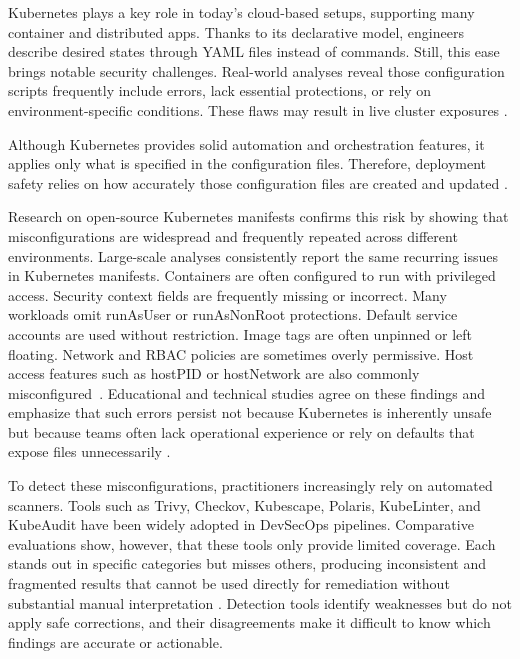 \documentclass[preprint,12pt]{elsarticle}
\begin{document}
Kubernetes plays a key role in today’s cloud-based setups, supporting many container and distributed apps. Thanks to its declarative model, engineers describe desired states through YAML files instead of commands. Still, this ease brings notable security challenges. Real-world analyses reveal those configuration scripts frequently include errors, lack essential protections, or rely on environment-specific conditions. These flaws may result in live cluster exposures \cite{rahman2023k8s}.



Although Kubernetes provides solid automation and orchestration features, it applies only what is specified in the configuration files. Therefore, deployment safety relies on how accurately those configuration files are created and updated \cite{rout2024kubernetes,rahman2023k8s}.





Research on open-source Kubernetes manifests confirms this risk by showing that misconfigurations are widespread and frequently repeated across different environments. Large-scale analyses consistently report the same recurring issues in Kubernetes manifests. Containers are often configured to run with privileged access. Security context fields are frequently missing or incorrect. Many workloads omit runAsUser or runAsNonRoot protections. Default service accounts are used without restriction. Image tags are often unpinned or left floating. Network and RBAC policies are sometimes overly permissive. Host access features such as hostPID or hostNetwork are also commonly misconfigured~\cite{rahman2023k8s,dellimmagine2023kubehound}. Educational and technical studies agree on these findings and emphasize that such errors persist not because Kubernetes is inherently unsafe but because teams often lack operational experience or rely on defaults that expose files unnecessarily \cite{shamim2024technoeducational}.





To detect these misconfigurations, practitioners increasingly rely on automated scanners. Tools such as Trivy, Checkov, Kubescape, Polaris, KubeLinter, and KubeAudit have been widely adopted in DevSecOps pipelines. Comparative evaluations show, however, that these tools only provide limited coverage. Each stands out in specific categories but misses others, producing inconsistent and fragmented results that cannot be used directly for remediation without substantial manual interpretation \cite{sivaraman2023mlk8s, dellimmagine2023kubehound}. Detection tools identify weaknesses but do not apply safe corrections, and their disagreements make it difficult to know which findings are accurate or actionable.
\end{document}
